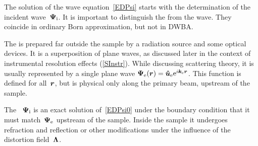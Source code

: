The solution of the wave equation~\cref{EDPsi}
starts with the determination of the incident wave~$\bm{\Psi}_{\text{i}}$.
%
%
%
%
%
%
%
It is important to distinguish the  from the  wave.
%
%
They coincide in ordinary Born approximation, but not in DWBA.

The 
is prepared far
outside the sample by a radiation source and some optical devices.
%
It is a superposition of plane waves,
as discussed later in the context of instrumental resolution effects
(\cref{SInstr}).
While discussing scattering theory,
it is usually represented by a single plane wave
$\bm{\Psi}_{\text{e}}(\bm{r})=\bm{\hat u}_{\text{e}}\mathrm e^{i{\bm{k}}_{\text{e}}\bm{r}}$.
%
This function is defined for all~$\bm{r}$,
but is physical only along the primary beam, upstream of the sample.

The ~$\bm{\Psi}_{\text{i}}$
%
%
%
is an exact solution of~\cref{EDPsi0}
under the boundary condition that it must match~$\bm{\Psi}_{\text{e}}$
upstream of the sample.
Inside the sample it undergoes refraction and reflection
or other modifications under the influence of the distortion field~$\bm{\Lambda}$.

